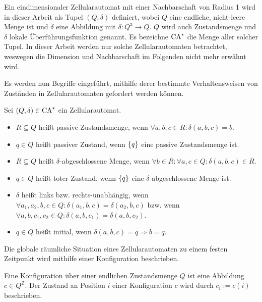 \begin{definition}[Zellularautomat]
    Ein eindimensionaler Zellularautomat mit einer Nachbarschaft von Radius 1 wird in dieser Arbeit als Tupel $(Q, \delta)$ definiert,
    wobei $Q$ eine endliche, nicht-leere Menge ist und
    $\delta$ eine Abbildung mit $\delta: Q^3 \to Q$.
    $Q$ wird auch Zustandsmenge und $\delta$ lokale Überführungsfunktion genannt.
    Es bezeichne $\textrm{CA}^*$ die Menge aller solcher Tupel.
    In dieser Arbeit werden nur solche Zellularautomaten betrachtet, weswegen die Dimension und Nachbarschaft im Folgenden nicht mehr erwähnt wird.
\end{definition}

Es werden nun Begriffe eingeführt, mithilfe derer bestimmte Verhaltensweisen von Zuständen in Zellularautomaten gefordert werden können.

\begin{definition}
    Sei $(Q, \delta) \in \textrm{CA}^*$ ein Zellularautomat.
    \begin{itemize}
        \item $R \subseteq Q$ heißt passive Zustandsmenge, wenn $\forall a, b, c \in R: \delta(a, b, c) = b$.
        \item $q \in Q$ heißt passiver Zustand, wenn $\{ {q} \}$ eine passive Zustandsmenge ist.
        \item $R \subseteq Q$ heißt $\delta$-abgeschlossene Menge, wenn $\forall b \in R: \forall a, c \in Q: \delta(a, b, c) \in R$.
        \item $q \in Q$ heißt toter Zustand, wenn $\{ {q} \}$ eine $\delta$-abgeschlossene Menge ist.
        \item $\delta$ heißt links \acs{bzw.} rechts-unabhängig,
            wenn $\forall a_1, a_2, b, c \in Q: \delta(a_1, b, c) = \delta(a_2, b, c)$
            \acs{bzw.}
            wenn $\forall a, b, c_1, c_2 \in Q: \delta(a, b, c_1) = \delta(a, b, c_2)$.
        \item $q \in Q$ heißt initial, wenn
            $\delta(a, b, c) = q \Rightarrow b = q$.
    \end{itemize}
\end{definition}

Die globale räumliche Situation eines Zellularautomaten zu einem festen Zeitpunkt wird mithilfe einer Konfiguration beschrieben.

\begin{definition}[Konfiguration]
    Eine Konfiguration über einer endlichen Zustandsmenge $Q$ ist eine Abbildung $c \in Q^{\mathbb{Z}}$.
    Der Zustand an Position $i$ einer Konfiguration $c$ wird durch $c_i := c(i)$ beschrieben.
\end{definition}

